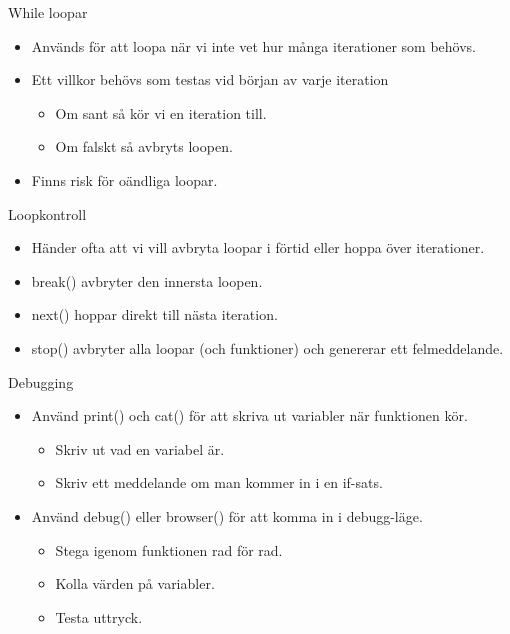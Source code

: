 \documentclass[
  11pt,
  ignorenonframetext,
]{beamer}
\providecommand{\tightlist}{%
  \setlength{\itemsep}{0pt}\setlength{\parskip}{0pt}}
\begin{document}
\begin{frame}{While loopar}
\label{while-loopar}
\begin{itemize}
\tightlist
\item
  Används för att loopa när vi inte vet hur många iterationer som
  behövs.
\item
  Ett villkor behövs som testas vid början av varje iteration

  \begin{itemize}
  \tightlist
  \item
    Om sant så kör vi en iteration till.
  \item
    Om falskt så avbryts loopen.
  \end{itemize}
\item
  Finns risk för oändliga loopar.
\end{itemize}
\end{frame}

\begin{frame}{Loopkontroll}
\label{loopkontroll}
\begin{itemize}
\tightlist
\item
  Händer ofta att vi vill avbryta loopar i förtid eller hoppa över
  iterationer.
\item
  break() avbryter den innersta loopen.
\item
  next() hoppar direkt till nästa iteration.
\item
  stop() avbryter alla loopar (och funktioner) och genererar ett
  felmeddelande.
\end{itemize}
\end{frame}

\begin{frame}{Debugging}
\label{debugging}
\begin{itemize}
\tightlist
\item
  Använd print() och cat() för att skriva ut variabler när funktionen
  kör.

  \begin{itemize}
  \tightlist
  \item
    Skriv ut vad en variabel är.
  \item
    Skriv ett meddelande om man kommer in i en if-sats.
  \end{itemize}
\item
  Använd debug() eller browser() för att komma in i debugg-läge.

  \begin{itemize}
  \tightlist
  \item
    Stega igenom funktionen rad för rad.
  \item
    Kolla värden på variabler.
  \item
    Testa uttryck.
  \end{itemize}
\end{itemize}
\end{frame}
\end{document}
